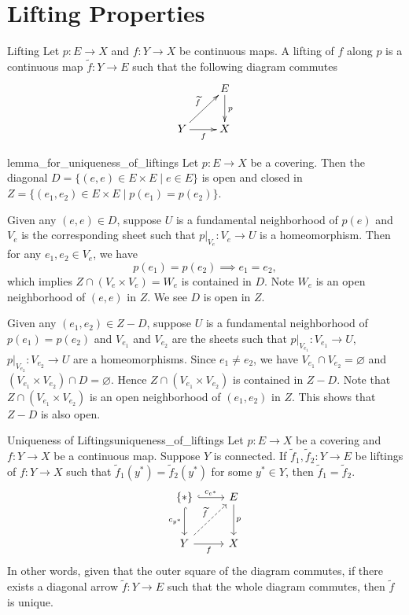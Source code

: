 \documentclass{report}
\begin{document}
\section{Lifting Properties}


\begin{definition}{Lifting}{}
	Let $p:E\to X$ and $f:Y\to X$ be continuous maps. A lifting of $f$ along $p$ is a continuous map $\widetilde{f}:Y\to E$ such that the following diagram commutes
	\[\xymatrix{
		& E\ar[d]^{p}\\
		Y\ar[ur]^{\widetilde{f}}\ar[r]_{f} &X
		}\]
\end{definition}




\begin{lemma}{}{lemma_for_uniqueness_of_liftings}
	Let $p: E \rightarrow X$ be a covering. Then the diagonal $D=\{(e, e) \in E \times E \mid e\in E\}$ is open and closed in $Z=\{(e_1, e_2) \in E \times E \mid p(e_1)=p(e_2)\}$.
\end{lemma}

\begin{prf}
	Given any $(e,e)\in D$, suppose $U$ is a fundamental neighborhood of $p(e)$ and $V_e$ is the corresponding sheet such that $\left.p\right|_{V_e}:V_e\to U$ is a homeomorphism. Then for any $e_1,e_2\in V_e$, we have
	\[
		p(e_1)=p(e_2)\implies e_1=e_2,
	\]
	which implies $Z \cap\left(V_e \times V_e\right)=W_e$ is contained in $D$. Note $W_e$ is an open neighborhood of $(e, e)$ in $Z$. We see $D$ is open in $Z$.

	Given any $(e_1,e_2)\in Z-D$, suppose $U$ is a fundamental neighborhood of $p(e_1)=p(e_2)$ and $V_{e_1}$ and $V_{e_2}$ are the sheets such that $\left.p\right|_{V_{e_1}}:V_{e_1}\to U$, $\left.p\right|_{V_{e_2}}:V_{e_2}\to U$ are a homeomorphisms. Since $e_1 \ne e_2$, we have $V_{e_1} \cap V_{e_2}=\varnothing$ and $\left(V_{e_1}\times V_{e_2}\right)\cap D=\varnothing$. Hence $Z \cap\left(V_{e_1} \times V_{e_2} \right)$  is contained in $Z-D$. Note that $Z \cap\left(V_{e_1} \times V_{e_2} \right)$ is an open neighborhood of $(e_1,e_2)$ in $Z$. This shows that $Z- D$ is also open.
\end{prf}


\begin{proposition}{Uniqueness of Liftings}{uniqueness_of_liftings}
	Let $p: E \rightarrow X$ be a covering and $f: Y \rightarrow X$ be a continuous map. Suppose $Y$ is connected. If $\widetilde{f}_1, \widetilde{f}_2: Y \rightarrow E$ be liftings of $f: Y \rightarrow X$ such that $\widetilde{f}_1(y^*)=\widetilde{f}_2(y^*)$ for some $y^*\in Y$, then $\widetilde{f}_1=\widetilde{f}_2$.
	\[
		\begin{tikzcd}[ampersand replacement=\&]
			\{*\} \arrow[r, "c_{e^*}", hook] \arrow[d, "c_{y^*}"', hook]                      \& E \arrow[d, "p"] \\ [+8pt]
			Y \arrow[r, "f"'] \arrow[ru, "\widetilde{f}", dashed] \& X
		\end{tikzcd}
	\]
	In other words, given that the outer square of the diagram commutes, if there exists a diagonal arrow $\widetilde{f}:Y\to E$ such that the whole diagram commutes, then $\widetilde{f}$ is unique.
\end{proposition}
\end{document}
